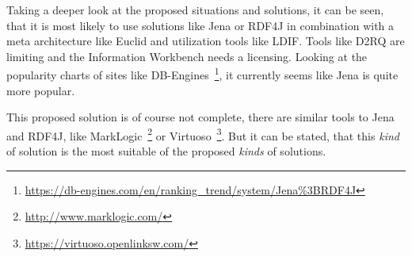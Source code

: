 Taking a deeper look at the proposed situations and solutions, it can be seen, that it is most likely to use solutions like Jena or RDF4J in combination with a meta architecture like Euclid and utilization tools like LDIF. Tools like D2RQ are limiting and the Information Workbench needs a licensing. Looking at the popularity charts of sites like DB-Engines~\footnote{\url{https://db-engines.com/en/ranking_trend/system/Jena\%3BRDF4J}}, it currently seems like Jena is quite more popular.

This proposed solution is of course not complete, there are similar tools to Jena and RDF4J, like MarkLogic~\footnote{\url{http://www.marklogic.com/}} or Virtuoso~\footnote{\url{https://virtuoso.openlinksw.com/}}. But it can be stated, that this \textit{kind} of solution is the most suitable of the proposed \textit{kinds} of solutions.